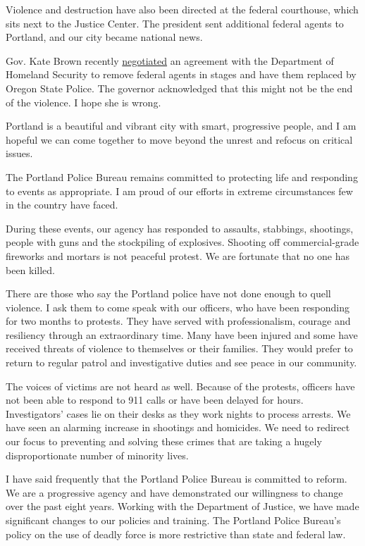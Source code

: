 Violence and destruction have also been directed at the federal
courthouse, which sits next to the Justice Center. The president sent
additional federal agents to Portland, and our city became national
news.

Gov. Kate Brown recently
\href{https://www.nytimes3xbfgragh.onion/2020/07/29/us/protests-portland-federal-withdrawal.html}{negotiated}
an agreement with the Department of Homeland Security to remove federal
agents in stages and have them replaced by Oregon State Police. The
governor acknowledged that this might not be the end of the violence. I
hope she is wrong.

Portland is a beautiful and vibrant city with smart, progressive people,
and I am hopeful we can come together to move beyond the unrest and
refocus on critical issues.

The Portland Police Bureau remains committed to protecting life and
responding to events as appropriate. I am proud of our efforts in
extreme circumstances few in the country have faced.

During these events, our agency has responded to assaults, stabbings,
shootings, people with guns and the stockpiling of explosives. Shooting
off commercial-grade fireworks and mortars is not peaceful protest. We
are fortunate that no one has been killed.

There are those who say the Portland police have not done enough to
quell violence. I ask them to come speak with our officers, who have
been responding for two months to protests. They have served with
professionalism, courage and resiliency through an extraordinary time.
Many have been injured and some have received threats of violence to
themselves or their families. They would prefer to return to regular
patrol and investigative duties and see peace in our community.

The voices of victims are not heard as well. Because of the protests,
officers have not been able to respond to 911 calls or have been delayed
for hours. Investigators' cases lie on their desks as they work nights
to process arrests. We have seen an alarming increase in shootings and
homicides. We need to redirect our focus to preventing and solving these
crimes that are taking a hugely disproportionate number of minority
lives.

I have said frequently that the Portland Police Bureau is committed to
reform. We are a progressive agency and have demonstrated our
willingness to change over the past eight years. Working with the
Department of Justice, we have made significant changes to our policies
and training. The Portland Police Bureau's policy on the use of deadly
force is more restrictive than state and federal law.

